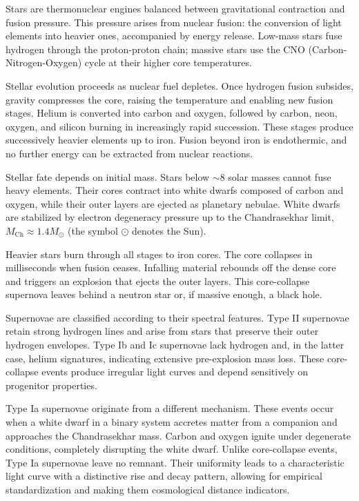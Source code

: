 Stars are thermonuclear engines balanced between gravitational contraction and fusion pressure. This pressure arises from nuclear fusion: the conversion of light elements into heavier ones, accompanied by energy release. Low-mass stars fuse hydrogen through the proton-proton chain; massive stars use the CNO (Carbon-Nitrogen-Oxygen) cycle at their higher core temperatures.

Stellar evolution proceeds as nuclear fuel depletes. Once hydrogen fusion subsides, gravity compresses the core, raising the temperature and enabling new fusion stages. Helium is converted into carbon and oxygen, followed by carbon, neon, oxygen, and silicon burning in increasingly rapid succession. These stages produce successively heavier elements up to iron. Fusion beyond iron is endothermic, and no further energy can be extracted from nuclear reactions.

Stellar fate depends on initial mass. Stars below $\sim 8$ solar masses cannot fuse heavy elements. Their cores contract into white dwarfs composed of carbon and oxygen, while their outer layers are ejected as planetary nebulae. White dwarfs are stabilized by electron degeneracy pressure up to the Chandrasekhar limit, $M_{\text{Ch}} \approx 1.4 M_\odot$ (the symbol $\odot$ denotes the Sun).

Heavier stars burn through all stages to iron cores. The core collapses in milliseconds when fusion ceases. Infalling material rebounds off the dense core and triggers an explosion that ejects the outer layers. This core-collapse supernova leaves behind a neutron star or, if massive enough, a black hole.

Supernovae are classified according to their spectral features. Type II supernovae retain strong hydrogen lines and arise from stars that preserve their outer hydrogen envelopes. Type Ib and Ic supernovae lack hydrogen and, in the latter case, helium signatures, indicating extensive pre-explosion mass loss. These core-collapse events produce irregular light curves and depend sensitively on progenitor properties.

Type Ia supernovae originate from a different mechanism. These events occur when a white dwarf in a binary system accretes matter from a companion and approaches the Chandrasekhar mass. Carbon and oxygen ignite under degenerate conditions, completely disrupting the white dwarf. Unlike core-collapse events, Type Ia supernovae leave no remnant. Their uniformity leads to a characteristic light curve with a distinctive rise and decay pattern, allowing for empirical standardization and making them cosmological distance indicators.

